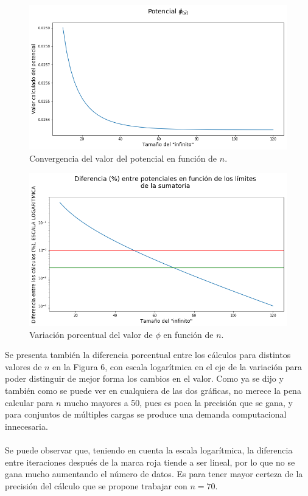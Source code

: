 \documentclass[12pt, notitlepage]{article}
\begin{document}
\begin{figure}[H]
\centering
\includegraphics[width=\linewidth]{./Imagenes/phi_n.png}
\caption{Convergencia del valor del potencial en función de $n$.}
\end{figure}
\begin{figure}[H]
\centering
\includegraphics[width=\linewidth]{./Imagenes/delta_n.png}
\caption{Variación porcentual del valor de $\phi$ en función de $n$.}
\end{figure}
\noindent
Se presenta también la diferencia porcentual entre los cálculos para distintos valores de $n$ en la Figura 6, con escala logarítmica en el eje de la variación para poder distinguir de mejor forma los cambios en el valor. Como ya se dijo y también como se puede ver en cualquiera de las dos gráficas, no merece la pena calcular para $n$ mucho mayores a 50, pues es poca la precisión que se gana, y para conjuntos de múltiples cargas se produce una demanda computacional innecesaria.\\\\
Se puede observar que, teniendo en cuenta la escala logarítmica, la diferencia entre iteraciones después de la marca roja tiende a ser lineal, por lo que no se gana mucho aumentando el número de datos. Es para tener mayor certeza de la precisión del cálculo que se propone trabajar con $n = 70$. 
\end{document}
